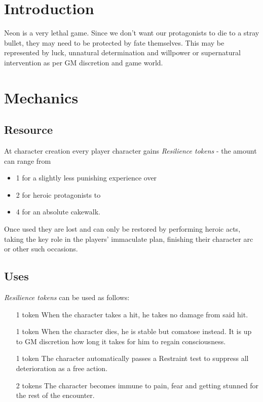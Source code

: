 \documentclass[12pt,a4paper,openany]{book}
\begin{document}
	

	\chapter{Introduction}
	Neon is a very lethal game. Since we don't want our protagonists to die to a stray bullet, they may need to be protected by fate themselves. This may be represented by luck, unnatural determination and willpower or supernatural intervention as per GM discretion and game world.

	\chapter{Mechanics}
	\section{Resource}
	At character creation every player character gains \emph{Resilience tokens} - the amount can range from
	\begin{itemize}
		\item 1 for a slightly less punishing experience over
		\item 2 for heroic protagonists to
		\item 4 for an absolute cakewalk.
	\end{itemize}
	Once used they are lost and can only be restored by performing heroic acts, taking the key role in the players' immaculate plan, finishing their character arc or other such occasions.

	\section{Uses}
	\emph{Resilience tokens} can be used as follows:
	\begin{itemize}
		\item[1 token] When the character takes a hit, he takes no damage from said hit.
		\item[1 token] When the character dies, he is stable but comatose instead. It is up to GM discretion how long it takes for him to regain consciousness.
		\item[1 token] The character automatically passes a Restraint test to suppress all deterioration as a free action.
		\item[2 tokens] The character becomes immune to pain, fear and getting stunned for the rest of the encounter.
	\end{itemize}
\end{document}
